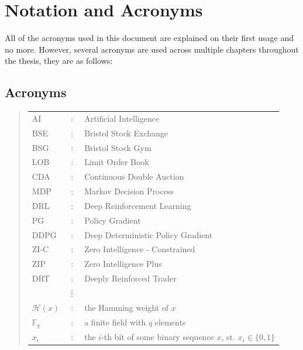\documentclass[ %
                    author={Ashwinder Khurana},
                supervisor={Prof Dave Cliff},
                    degree={MEng},
                     title={The Deeply Reinforced Trader},
                  subtitle={},
                      type={enterprise},
                      year={2020} ]{dissertation}
\begin{document}
\chapter*{Notation and Acronyms}

\noindent
All of the acronyms used in this document are explained on their first usage and no more. However, several acronyms are used across multiple chapters throughout the thesis, they are as follows:

\section*{Acronyms}

\begin{quote}
\noindent
\begin{tabular}{lcl}
AI         &:     & Artificial Intelligence                         \\
BSE     &:     & Bristol Stock Exchange                     \\
BSG    &:      & Bristol Stock Gym                              \\
LOB    &:     & Limit Order Book                                \\
CDA    &:     & Continuous Double Auction                \\
MDP   &:      & Markov Decision Process                  \\
DRL     &:     & Deep Reinforcement Learning           \\
PG      &:      & Policy Gradient                                   \\
DDPG &:      & Deep Deterministic Policy Gradient    \\
ZI-C    &:       & Zero Intelligence - Constrained          \\
ZIP     &:      & Zero Intelligence Plus                          \\
DRT   &:      & Deeply Reinforced Trader                    \\


                    &\vdots&                                                                      \\
${\mathcal H}( x )$ &:     & the Hamming weight of $x$                                            \\
${\mathbb  F}_q$    &:     & a finite field with $q$ elements                                     \\
$x_i$               &:     & the $i$-th bit of some binary sequence $x$, st. $x_i \in \{ 0, 1 \}$ \\
\end{tabular}
\end{quote}
\end{document}
